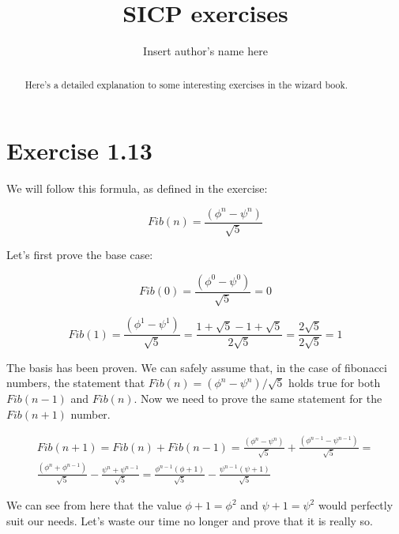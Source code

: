 \documentclass{article}
\begin{document}
\title{SICP exercises}
\author{Insert author's name here}

\maketitle

\begin{abstract}
	Here's a detailed explanation to some interesting exercises in the wizard book.
\end{abstract}

\section{Exercise 1.13}
	
	We will follow this formula, as defined in the exercise:

	\begin{equation}
		\label{fibonacci_approximation}
		Fib(n) = {\frac {\left(\phi^n-\psi^n \right)} {\sqrt5}}
	\end {equation}

	Let's first prove the base case:

	\begin{equation}
		Fib(0) = {\frac {\left(\phi^0-\psi^0 \right)} {\sqrt5}} = 0
	\end{equation}

	\begin{equation}
		Fib(1) = {\frac {\left(\phi^1-\psi^1 \right)} {\sqrt5}} = \frac {1 + \sqrt5 - 1 + \sqrt5} {2\sqrt5} = \frac {2\sqrt5} {2\sqrt5} = 1
	\end{equation}

The basis has been proven. We can safely assume that, in the case of fibonacci numbers, the statement that $Fib(n) = \left(\phi^n-\psi^n\right)/\sqrt5$ holds true for both $Fib(n-1)$ and $Fib(n)$. Now we need to prove the same statement for the $Fib(n+1)$ number.

\begin{multline}
	Fib(n+1) = Fib(n) + Fib(n-1) = \frac {\left(\phi^n-\psi^n\right)} {\sqrt5} + \frac {\left(\phi^{n-1}-\psi^{n-1}\right)} {\sqrt5} = \\
	\frac {\left(\phi^n+\phi^{n-1}\right)} {\sqrt5} - \frac {\psi^n+\psi^{n-1}} {\sqrt5} = \frac {\phi^{n-1}\left(\phi+1\right)} {\sqrt5} - \frac {\psi^{n-1}\left(\psi+1\right)} {\sqrt5}
\end{multline}

We can see from here that the value $\phi+1=\phi^2$ and $\psi+1=\psi^2$ would perfectly suit our needs. Let's waste our time no longer and prove that it is really so.
\end{document}
